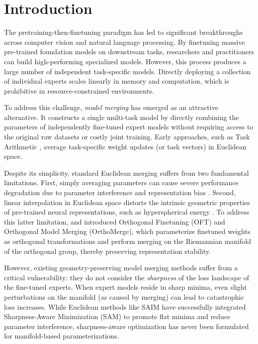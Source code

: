 \documentclass{article}
\theoremstyle{plain}
\theoremstyle{definition}
\theoremstyle{remark}
\begin{document}
\section{Introduction}
\label{sec:intro}

The pretraining-then-finetuning paradigm has led to significant breakthroughs across computer vision and natural language processing. By finetuning massive pre-trained foundation models on downstream tasks, researchers and practitioners can build high-performing specialized models. However, this process produces a large number of independent task-specific models. Directly deploying a collection of individual experts scales linearly in memory and computation, which is prohibitive in resource-constrained environments.

To address this challenge, \textit{model merging} \cite{ilharco23taskvectors, wortsman22modelsoups} has emerged as an attractive alternative. It constructs a single multi-task model by directly combining the parameters of independently fine-tuned expert models without requiring access to the original raw datasets or costly joint training. Early approaches, such as Task Arithmetic \cite{ilharco23taskvectors}, average task-specific weight updates (or task vectors) in Euclidean space.

Despite its simplicity, standard Euclidean merging suffers from two fundamental limitations. First, simply averaging parameters can cause severe performance degradation due to parameter interference and representation bias \cite{yang25surgeryv2}. Second, linear interpolation in Euclidean space distorts the intrinsic geometric properties of pre-trained neural representations, such as hyperspherical energy \cite{hendrycks19robustness}. To address this latter limitation, \citet{qiu23oft} and \citet{qiu25oft_scalable} introduced Orthogonal Finetuning (OFT) and Orthogonal Model Merging (OrthoMerge), which parameterize finetuned weights as orthogonal transformations and perform merging on the Riemannian manifold of the orthogonal group, thereby preserving representation stability.

However, existing geometry-preserving model merging methods suffer from a critical vulnerability: they do not consider the \textit{sharpness} of the loss landscape of the fine-tuned experts. When expert models reside in sharp minima, even slight perturbations on the manifold (as caused by merging) can lead to catastrophic loss increases. While Euclidean methods like SAIM \cite{marczak25isoc} have successfully integrated Sharpness-Aware Minimization (SAM) \cite{foret21sam} to promote flat minima and reduce parameter interference, sharpness-aware optimization has never been formulated for manifold-based parameterizations.
\end{document}
